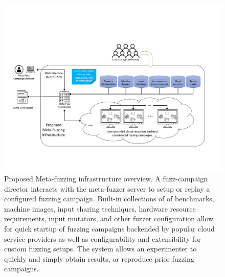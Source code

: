 \begin{figure}[htbp!]


\includegraphics[width=\textwidth,trim={0.4in 1.25in 0.8in 2.0in},clip]{figures/mf-arch.pdf}

\caption{Proposed Meta-fuzzing infrastructure overview.  
A fuzz-campaign director interacts with the meta-fuzzer server to setup or replay a configured fuzzing campaign.  
Built-in collections of of benchmarks, machine images, input sharing techniques, hardware resource requirements, input mutators, and other fuzzer configuration 
allow for quick startup of fuzzing campaigns backended by popular cloud service providers as well as configurability and extensibility for custom fuzzing setups.  
The system allows an experimenter to quickly and simply obtain results, or reproduce prior fuzzing campaigns.}
\label{fig:overview}
\end{figure}



